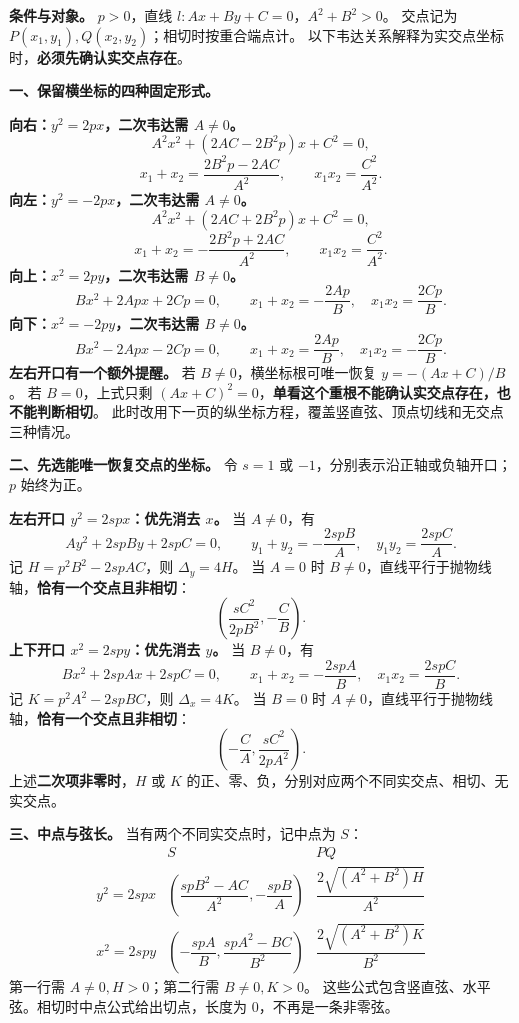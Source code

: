 \begin{statementbox}
\textbf{条件与对象。} $p>0$，直线 $l:Ax+By+C=0$，$A^2+B^2>0$。
交点记为 $P(x_1,y_1),Q(x_2,y_2)$；相切时按重合端点计。
以下韦达关系解释为实交点坐标时，\textbf{必须先确认实交点存在}。

\textbf{一、保留横坐标的四种固定形式。}

\textbf{向右：$y^2=2px$，二次韦达需 $A\ne0$。}
\[
 A^2x^2+(2AC-2B^2p)x+C^2=0,
\]
\[
 x_1+x_2=\frac{2B^2p-2AC}{A^2},\qquad x_1x_2=\frac{C^2}{A^2}.
\]
\textbf{向左：$y^2=-2px$，二次韦达需 $A\ne0$。}
\[
 A^2x^2+(2AC+2B^2p)x+C^2=0,
\]
\[
 x_1+x_2=-\frac{2B^2p+2AC}{A^2},\qquad x_1x_2=\frac{C^2}{A^2}.
\]
\textbf{向上：$x^2=2py$，二次韦达需 $B\ne0$。}
\[
 Bx^2+2Apx+2Cp=0,
 \qquad x_1+x_2=-\frac{2Ap}{B},\quad x_1x_2=\frac{2Cp}{B}.
\]
\textbf{向下：$x^2=-2py$，二次韦达需 $B\ne0$。}
\[
 Bx^2-2Apx-2Cp=0,
 \qquad x_1+x_2=\frac{2Ap}{B},\quad x_1x_2=-\frac{2Cp}{B}.
\]
\textbf{左右开口有一个额外提醒。}
若 $B\ne0$，横坐标根可唯一恢复 $y=-(Ax+C)/B$。
若 $B=0$，上式只剩 $(Ax+C)^2=0$，\textbf{单看这个重根不能确认实交点存在，也不能判断相切}。
此时改用下一页的纵坐标方程，覆盖竖直弦、顶点切线和无交点三种情况。
\end{statementbox}
\clearpage
\begin{statementbox}
\textbf{二、先选能唯一恢复交点的坐标。}
令 $s=1$ 或 $-1$，分别表示沿正轴或负轴开口；$p$ 始终为正。

\textbf{左右开口 $y^2=2spx$：优先消去 $x$。} 当 $A\ne0$，有
\[
 Ay^2+2spBy+2spC=0,\qquad
 y_1+y_2=-\frac{2spB}{A},\quad y_1y_2=\frac{2spC}{A}.
\]
记 $H=p^2B^2-2spAC$，则 $\Delta_y=4H$。
当 $A=0$ 时 $B\ne0$，直线平行于抛物线轴，\textbf{恰有一个交点且非相切}：
\[
 \left(\frac{sC^2}{2pB^2},-\frac CB\right).
\]
\textbf{上下开口 $x^2=2spy$：优先消去 $y$。} 当 $B\ne0$，有
\[
 Bx^2+2spAx+2spC=0,\qquad
 x_1+x_2=-\frac{2spA}{B},\quad x_1x_2=\frac{2spC}{B}.
\]
记 $K=p^2A^2-2spBC$，则 $\Delta_x=4K$。
当 $B=0$ 时 $A\ne0$，直线平行于抛物线轴，\textbf{恰有一个交点且非相切}：
\[
 \left(-\frac CA,\frac{sC^2}{2pA^2}\right).
\]
上述\textbf{二次项非零时}，$H$ 或 $K$ 的正、零、负，分别对应两个不同实交点、相切、无实交点。

\textbf{三、中点与弦长。} 当有两个不同实交点时，记中点为 $S$：
\[
\begin{array}{c|c|c}
 &S&PQ\\[3pt]\hline
 y^2=2spx&\left(\dfrac{spB^2-AC}{A^2},-\dfrac{spB}{A}\right)
 &\dfrac{2\sqrt{(A^2+B^2)H}}{A^2}\\[10pt]
 x^2=2spy&\left(-\dfrac{spA}{B},\dfrac{spA^2-BC}{B^2}\right)
 &\dfrac{2\sqrt{(A^2+B^2)K}}{B^2}
\end{array}
\]
第一行需 $A\ne0,H>0$；第二行需 $B\ne0,K>0$。
这些公式包含竖直弦、水平弦。相切时中点公式给出切点，长度为 $0$，不再是一条非零弦。
\end{statementbox}
\clearpage
